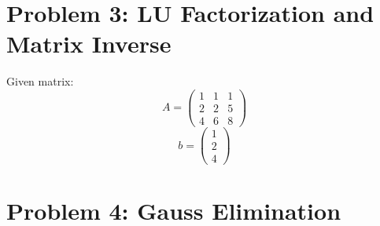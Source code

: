 \documentclass{article}
\begin{document}




\section*{Problem 3: LU Factorization and Matrix Inverse}

Given matrix:
\[ A = \begin{pmatrix} 1 & 1 & 1 \\ 2 & 2 & 5 \\ 4 & 6 & 8 \end{pmatrix} \]
\[ b = \begin{pmatrix} 1 \\ 2 \\ 4 \end{pmatrix} \]










\section*{Problem 4: Gauss Elimination}
\end{document}
